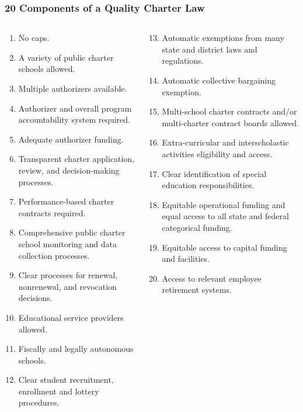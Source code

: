 \documentclass[10pt,handout,mathserif]{beamer}
\begin{document}
\begin{frame}
    \frametitle{20 Components of a Quality Charter Law}
    {\footnotesize
    \begin{columns}
        \begin{column}{0.5\textwidth}
            \begin{enumerate}
            \item No caps.
            \item A variety of public charter schools allowed.
            \item Multiple authorizers available.
            \item Authorizer and overall program accountability system required.
            \item Adequate authorizer funding.
            \item Transparent charter application, review, and decision-making processes.
            \item Performance-based charter contracts required.
            \item Comprehensive public charter school monitoring and data collection processes.
            \item Clear processes for renewal, nonrenewal, and revocation decisions.
            \item Educational service providers allowed.
            \item Fiscally and legally autonomous schools.
            \item Clear student recruitment, enrollment and lottery procedures.
            \end{enumerate}
        \end{column}
        \begin{column}{0.5\textwidth}
            \begin{enumerate}
            \setcounter{enumi}{12}
            \item Automatic exemptions from many state and district laws and regulations.
            \item Automatic collective bargaining exemption.
            \item Multi-school charter contracts and/or multi-charter contract boards allowed.
            \item Extra-curricular and interscholastic activities eligibility and access.
            \item Clear identification of special education responsibilities.
            \item Equitable operational funding and equal access to all state and federal categorical funding.
            \item Equitable access to capital funding and facilities.
            \item Access to relevant employee retirement systems.
            \end{enumerate}
            \cite{NAPCS2010a}
        \end{column}
    \end{columns}
    }
\end{frame}
\end{document}

